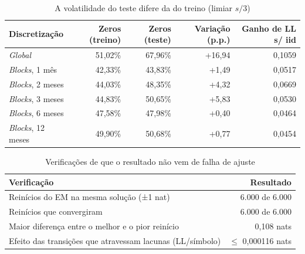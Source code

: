 \begin{table}[htb]
  \centering
  \caption{A volatilidade do teste difere da do treino (limiar $s/3$)}
  \label{tab:mtd_estacionariedade}
  \small
  \begin{tabular}{lrrrr}
    \toprule
    Discretização & Zeros (treino) & Zeros (teste) & Variação (p.p.) & Ganho de LL s/ iid \\
    \midrule
    \textit{Global} & 51,02\% & 67,96\% & +16,94 & 0,1059 \\
    \textit{Blocks}, 1 mês & 42,33\% & 43,83\% & +1,49 & 0,0517 \\
    \textit{Blocks}, 2 meses & 44,03\% & 48,35\% & +4,32 & 0,0669 \\
    \textit{Blocks}, 3 meses & 44,83\% & 50,65\% & +5,83 & 0,0530 \\
    \textit{Blocks}, 6 meses & 47,58\% & 47,98\% & +0,40 & 0,0464 \\
    \textit{Blocks}, 12 meses & 49,90\% & 50,68\% & +0,77 & 0,0454 \\
    \bottomrule
  \end{tabular}
\end{table}

\begin{table}[htb]
  \centering
  \caption{Verificações de que o resultado não vem de falha de ajuste}
  \label{tab:mtd_robustez}
  \small
  \begin{tabular}{lr}
    \toprule
    Verificação & Resultado \\
    \midrule
    Reinícios do EM na mesma solução (±1 nat) & 6.000 de 6.000 \\
    Reinícios que convergiram & 6.000 de 6.000 \\
    Maior diferença entre o melhor e o pior reinício & 0,108 nats \\
    Efeito das transições que atravessam lacunas (LL/símbolo) & $\leq$ 0,000116 nats \\
    \bottomrule
  \end{tabular}
\end{table}
